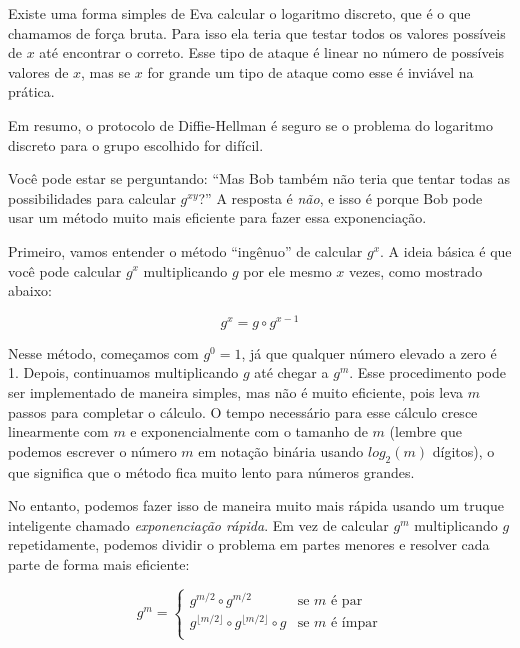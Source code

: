 Existe uma forma simples de Eva calcular o logaritmo discreto, que é o que chamamos de força bruta.
Para isso ela teria que testar todos os valores possíveis de $x$ até encontrar o correto. Esse tipo de ataque é linear no número de possíveis valores de $x$, mas se $x$ for grande um tipo de ataque como esse é inviável na prática.

Em resumo, o protocolo de Diffie-Hellman é seguro se o problema do logaritmo discreto para o grupo escolhido for difícil.


Você pode estar se perguntando:
``Mas Bob também não teria que tentar todas as possibilidades para calcular \( g^{xy} \)?''
A resposta é {\em não}, e isso é porque Bob pode usar um método muito mais eficiente para fazer essa exponenciação.

Primeiro, vamos entender o método ``ingênuo'' de calcular $g^x$.
A ideia básica é que você pode calcular $g^x$ multiplicando $g$ por ele mesmo $x$ vezes, como mostrado abaixo:

\begin{displaymath}
  g^x = g \circ g^{x-1}
\end{displaymath}

Nesse método, começamos com $g^0 = 1$, já que qualquer número elevado a zero é 1.
Depois, continuamos multiplicando $g$ até chegar a $g^m$.
Esse procedimento pode ser implementado de maneira simples, mas não é muito eficiente, pois leva $m$ passos para completar o cálculo.
O tempo necessário para esse cálculo cresce linearmente com $m$ e exponencialmente com o tamanho de $m$ (lembre que podemos escrever o número $m$ em notação binária usando $log_2(m)$ dígitos), o que significa que o método fica muito lento para números grandes.

No entanto, podemos fazer isso de maneira muito mais rápida usando um truque inteligente chamado \textit{exponenciação rápida}.
Em vez de calcular $g^m$ multiplicando $g$ repetidamente, podemos dividir o problema em partes menores e resolver cada parte de forma mais eficiente:

\begin{displaymath}
  g^m = \left\{
    \begin{array}{lcl}
      g^{m/2} \circ g^{m/2} & \text{se } m \text{ é par} \\
      g^{\lfloor m/2 \rfloor} \circ g^{\lfloor m/2 \rfloor} \circ g & \text{se } m \text{ é ímpar}\\
    \end{array}
  \right.
\end{displaymath}

